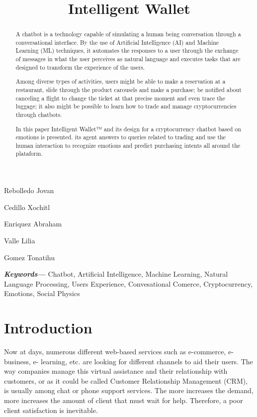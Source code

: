 \documentclass[	DIV=calc,%
							paper=letter,%
							fontsize=12pt%
                            ]{scrartcl}	 					%
\title{Intelligent Wallet}					%
\author{}											%
\date{}																				%
\newcommand{\initial}[1]{%
     \lettrine[lines=3,lhang=0.3,nindent=0em]{
     				\color{DarkGoldenrod}
     				{\textsf{#1}}}{}}
\providecommand{\keywords}[1]
{
  \small	
  \textbf{\textit{Keywords---}} #1
}
\begin{document}
\maketitle
\centering
Rebolledo Jovan
 
Cedillo Xochitl
 
Enriquez Abraham 

Valle Lilia

Gomez Tonatihu



\newpage
\begin{abstract}
	
{A chatbot is a technology capable of simulating a human being conversation through a conversational interface. By the use of Artificial Intelligence (AI) and Machine Learning (ML) techniques, it automates the responses to a user through the exchange of messages in what the user perceives as natural language and executes tasks that are designed to transform the experience of the users.

Among diverse types of activities, users might be able to make a reservation   at a restaurant, slide through the product carousels and make a purchase; be notified about canceling a flight to change the ticket at that precise moment and even trace the luggage; it also might be possible to learn how to trade and manage cryptocurrencies through chatbots.

In this paper Intelligent Wallet™ and its design for a cryptocurrency chatbot based on emotions is presented. its agent  answers to queries related to trading and use the human interaction to recognize emotions and predict purchasing intents all around the plataform.}

\end{abstract}

\keywords{Chatbot, Artificial Intelligence, Machine Learning, Natural Language Processing, Users Experience, Convesational Comerce, Cryptocurrency, Emotions, Social Physics}

\newpage
\tableofcontents
\newpage
\listoffigures
\newpage

\thispagestyle{fancy} 			%

\section{\label{sec:level1}Introduction}
Now at days, numerous different web-based services such as e-commerce, e-business, e- learning, etc. are looking for different channels to aid their users. The way companies manage this virtual assistance and their relationship with customers, or as it could be called Customer Relationship Management (CRM), is usually among chat or phone support services. The more increases the demand, more increases the amount of client that must wait for help.  Therefore, a poor client satisfaction is inevitable\cite{ranoliya2017chatbot_08126057}.
\end{document}
